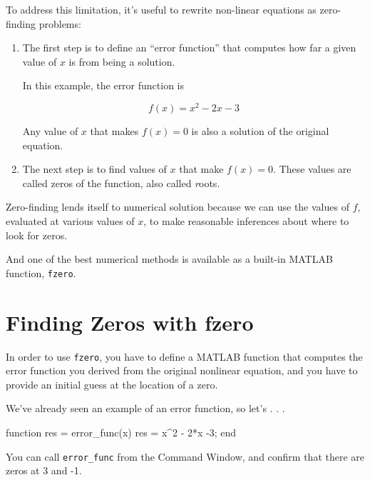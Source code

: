 
To address this limitation, it's useful to
rewrite non-linear equations as zero-finding problems:

\begin{enumerate}

\item The first step is to define an ``error function'' that computes how far
a given value of $x$ is from being a solution.

In this example, the error function is

\begin{equation}
f(x) = x^2 - 2x -3
\end{equation}

Any value of $x$ that makes $f(x) = 0$ is also a solution
of the original equation.


\item The next step is to find values of $x$ that make
$f(x) = 0$.  These values are called zeros of the
function, also called {\emph roots}.


\end{enumerate}

Zero-finding lends itself to numerical solution because we can
use the values of $f$, evaluated at various values of $x$, to
make reasonable inferences about where to look for zeros.

And one of the best numerical methods is available as a built-in MATLAB function, {\tt fzero}.


\section{Finding Zeros with fzero}
\label{fzero}


In order to use {\tt fzero}, you have to define a MATLAB function
that computes the error function you derived from the original
nonlinear equation, and you have to provide an initial guess at
the location of a zero.

We've already seen an example of an error function, so let's . . . 

\begin{code}
function res = error_func(x)
    res = x^2 - 2*x -3;
end
\end{code}

You can call {\tt error\_func} from the Command Window, and
confirm that there are zeros at 3 and -1.

